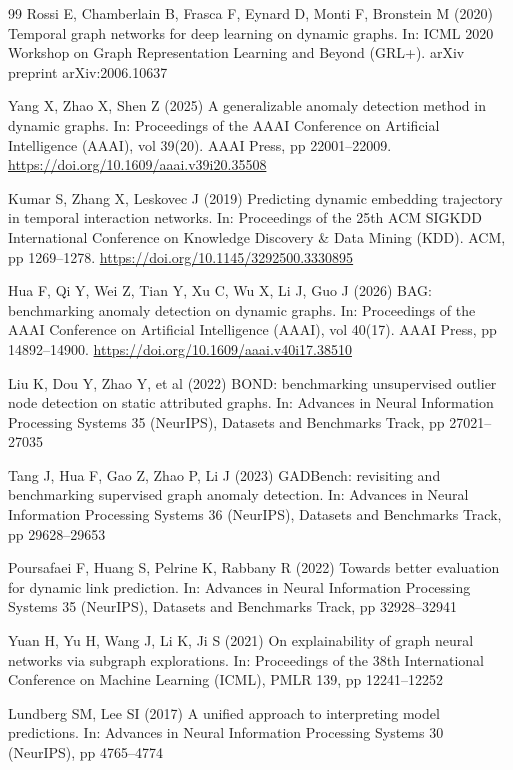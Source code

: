 \documentclass[pdflatex,sn-basic]{sn-jnl}
\theoremstyle{definition}
\theoremstyle{plain}
\begin{document}
\begin{thebibliography}{99}
Rossi E, Chamberlain B, Frasca F, Eynard D, Monti F, Bronstein M (2020) Temporal graph networks for deep learning on dynamic graphs. In: ICML 2020 Workshop on Graph Representation Learning and Beyond (GRL+). arXiv preprint arXiv:2006.10637

Yang X, Zhao X, Shen Z (2025) A generalizable anomaly detection method in dynamic graphs. In: Proceedings of the AAAI Conference on Artificial Intelligence (AAAI), vol 39(20). AAAI Press, pp 22001--22009. \url{https://doi.org/10.1609/aaai.v39i20.35508}

Kumar S, Zhang X, Leskovec J (2019) Predicting dynamic embedding trajectory in temporal interaction networks. In: Proceedings of the 25th ACM SIGKDD International Conference on Knowledge Discovery \& Data Mining (KDD). ACM, pp 1269--1278. \url{https://doi.org/10.1145/3292500.3330895}

Hua F, Qi Y, Wei Z, Tian Y, Xu C, Wu X, Li J, Guo J (2026) BAG: benchmarking anomaly detection on dynamic graphs. In: Proceedings of the AAAI Conference on Artificial Intelligence (AAAI), vol 40(17). AAAI Press, pp 14892--14900. \url{https://doi.org/10.1609/aaai.v40i17.38510}

Liu K, Dou Y, Zhao Y, et al (2022) BOND: benchmarking unsupervised outlier node detection on static attributed graphs. In: Advances in Neural Information Processing Systems 35 (NeurIPS), Datasets and Benchmarks Track, pp 27021--27035

Tang J, Hua F, Gao Z, Zhao P, Li J (2023) GADBench: revisiting and benchmarking supervised graph anomaly detection. In: Advances in Neural Information Processing Systems 36 (NeurIPS), Datasets and Benchmarks Track, pp 29628--29653

Poursafaei F, Huang S, Pelrine K, Rabbany R (2022) Towards better evaluation for dynamic link prediction. In: Advances in Neural Information Processing Systems 35 (NeurIPS), Datasets and Benchmarks Track, pp 32928--32941

Yuan H, Yu H, Wang J, Li K, Ji S (2021) On explainability of graph neural networks via subgraph explorations. In: Proceedings of the 38th International Conference on Machine Learning (ICML), PMLR 139, pp 12241--12252

Lundberg SM, Lee SI (2017) A unified approach to interpreting model predictions. In: Advances in Neural Information Processing Systems 30 (NeurIPS), pp 4765--4774


\end{thebibliography}
\end{document}
